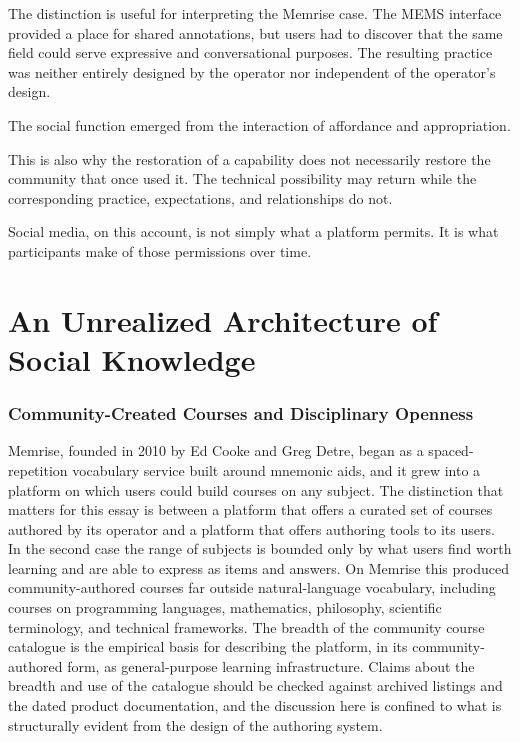 \documentclass[11pt]{article}
\theoremstyle{remark}
\begin{document}
The distinction is useful for interpreting
the Memrise case. The MEMS interface provided
a place for shared annotations, but users
had to discover that the same field could
serve expressive and conversational purposes.
The resulting practice was neither entirely
designed by the operator nor independent
of the operator's design.

The social function emerged from the
interaction of affordance and appropriation.

This is also why the restoration of a
capability does not necessarily restore
the community that once used it.
The technical possibility may return
while the corresponding practice,
expectations, and relationships do not.

Social media, on this account, is not
simply what a platform permits. It is
what participants make of those
permissions over time.

\part{An Unrealized Architecture of Social Knowledge}

\section{Community-Created Courses and Disciplinary Openness}

Memrise, founded in 2010 by Ed Cooke and Greg Detre, began as a spaced-repetition vocabulary service built around mnemonic aids, and it grew into a platform on which users could build courses on any subject. The distinction that matters for this essay is between a platform that offers a curated set of courses authored by its operator and a platform that offers authoring tools to its users. In the second case the range of subjects is bounded only by what users find worth learning and are able to express as items and answers. On Memrise this produced community-authored courses far outside natural-language vocabulary, including courses on programming languages, mathematics, philosophy, scientific terminology, and technical frameworks. The breadth of the community course catalogue is the empirical basis for describing the platform, in its community-authored form, as general-purpose learning infrastructure. Claims about the breadth and use of the catalogue should be checked against archived listings and the dated product documentation, and the discussion here is confined to what is structurally evident from the design of the authoring system.
\end{document}
